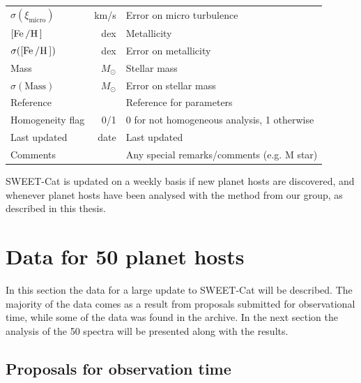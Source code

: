 \begin{table}[htb!]
\begin{tabular}{lrl}
      $\sigma(\xi_\mathrm{micro})$   & \si{km/s} & Error on micro turbulence                            \\
      $[\ion{Fe}/\ion{H}]$           & \si{dex}  & Metallicity                                          \\
      $\sigma([\ion{Fe}/\ion{H}])$   & \si{dex}  & Error on metallicity                                 \\
      Mass                           & $M_\odot$ & Stellar mass                                         \\
      $\sigma(\mathrm{Mass})$        & $M_\odot$ & Error on stellar mass                                \\
      Reference                      &           & Reference for parameters                             \\
      Homogeneity flag               & 0/1       & 0 for not homogeneous analysis, 1 otherwise          \\
      Last updated                   & date      & Last updated                                         \\
      Comments                       &           & Any special remarks/comments (e.g. M star)           \\
      \hline
    \end{tabular}
\end{table}

SWEET-Cat is updated on a weekly basis if new planet hosts are discovered, and whenever planet hosts
have been analysed with the method from our group, as described in this thesis.


\section{Data for 50 planet hosts}

In this section the data for a large update to SWEET-Cat will be described. The majority of the data
comes as a result from proposals submitted for observational time, while some of the data was found
in the archive. In the next section the analysis of the 50 spectra will be presented along with the
results.


\subsection{Proposals for observation time}


